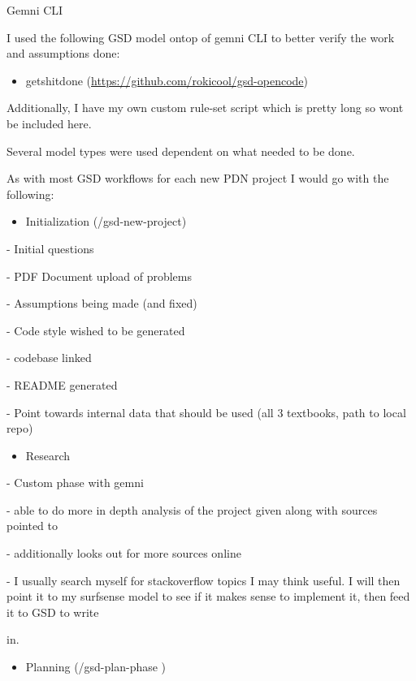 Gemni CLI

I used the following GSD model ontop of gemni CLI to better verify the
work and assumptions done:

\begin{itemize}
\item
  getshitdone (\url{https://github.com/rokicool/gsd-opencode})
\end{itemize}

Additionally, I have my own custom rule-set script which is pretty long
so won\textquotesingle t be included here.

Several model types were used dependent on what needed to be done.

As with most GSD workflows for each new PDN project I would go with the
following:

\begin{itemize}
\item
  Initialization (/gsd-new-project)
\end{itemize}

- Initial questions

- PDF Document upload of problems

- Assumptions being made (and fixed)

- Code style wished to be generated

- codebase linked

- README generated

- Point towards internal data that should be used (all 3 textbooks, path
to local repo)

\begin{itemize}
\item
  Research
\end{itemize}

- Custom phase with gemni

- able to do more in depth analysis of the project given along with
sources pointed to

- additionally looks out for more sources online

- I usually search myself for stackoverflow topics I may think useful. I
will then point it to my surfsense model to see if it makes sense to
implement it, then feed it to GSD to write

in.

\begin{itemize}
\item
  Planning (/gsd-plan-phase )
\end{itemize}

